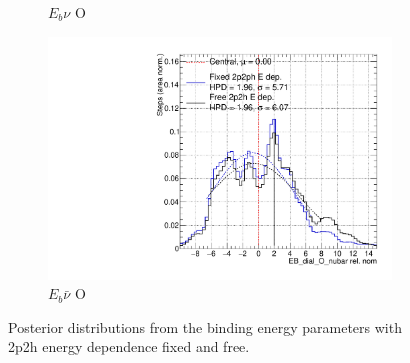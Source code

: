 \begin{figure}
\begin{subfigure}{.48\textwidth}
  \caption{$E_{b}\nu$ O}
\end{subfigure}
\begin{subfigure}{.48\textwidth}
  \centering
  \includegraphics[width=0.73\linewidth]{figs/2p2h_EB_dial_O_nubar}
  \caption{$E_{b}\bar{\nu}$ O}
\end{subfigure}
\caption{Posterior distributions from the binding energy parameters with 2p2h energy dependence fixed and free.}
\label{fig:2p2hEbdata}
\end{figure}

\newpage
